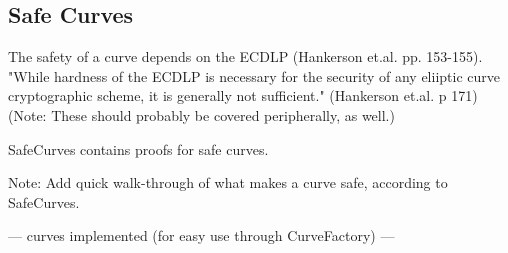 \subsection{Safe Curves}

The safety of a curve depends on the ECDLP (Hankerson et.al. pp. 153-155). "While hardness of the ECDLP is necessary
for the security of any eliiptic curve cryptographic scheme, it is generally not sufficient." (Hankerson et.al. p 171)
(Note: These should probably be covered peripherally, as well.)

SafeCurves contains proofs for safe curves. 

Note: Add quick walk-through of what makes a curve safe, according to SafeCurves.

--- curves implemented (for easy use through CurveFactory) ---